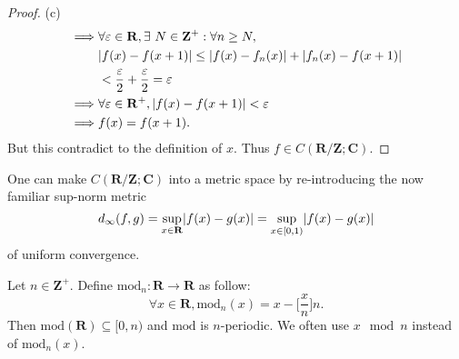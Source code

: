 \begin{proof}{(c)}
\begin{align*}
        \implies & \forall \varepsilon \in \mathbf{R}, \exists\ N \in \mathbf{Z}^+ : \forall n \geq N,                                                  \\
                 & \abs*{f(x) - f(x + 1)} \leq \abs*{f(x) - f_n(x)} + \abs*{f_n(x) - f(x + 1)}                                                          \\
                 & < \frac{\varepsilon}{2} + \frac{\varepsilon}{2} = \varepsilon                                                                        \\
        \implies & \forall \varepsilon \in \mathbf{R}^+, \abs*{f(x) - f(x + 1)} < \varepsilon                                                           \\
        \implies & f(x) = f(x + 1).
    \end{align*}
    But this contradict to the definition of \(x\).
    Thus \(f \in C(\mathbf{R} / \mathbf{Z} ; \mathbf{C})\).
\end{proof}

\begin{note}
    One can make \(C(\mathbf{R} / \mathbf{Z} ; \mathbf{C})\) into a metric space by re-introducing the now familiar sup-norm metric
    \[
        d_\infty(f, g) = \sup_{x \in \mathbf{R}} \abs*{f(x) - g(x)} = \sup_{x \in [0, 1)} \abs*{f(x) - g(x)}
    \]
    of uniform convergence.
\end{note}

\begin{additional corollary}\label{ac 5.1.1}
Let \(n \in \mathbf{Z}^+\).
Define \(\text{mod}_n : \mathbf{R} \to \mathbf{R}\) as follow:
\[
    \forall x \in \mathbf{R}, \text{mod}_n(x) = x - \bigg[\frac{x}{n}\bigg] n.
\]
Then \(\text{mod}(\mathbf{R}) \subseteq [0, n)\) and \(\text{mod}\) is \(n\)-periodic.
We often use \(x \mod n\) instead of \(\text{mod}_n(x)\).
\end{additional corollary}

